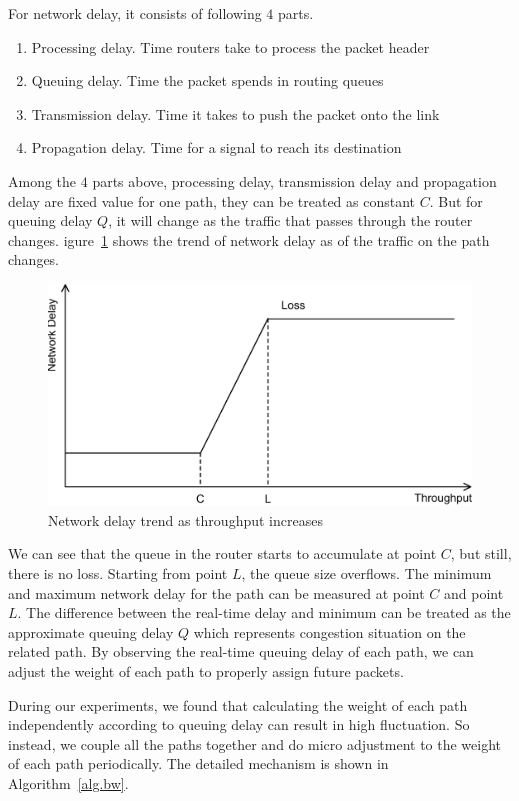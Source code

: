 For network delay, it consists of following $4$ parts.

\begin{enumerate}
\item Processing delay. Time routers take to process the packet header
\item Queuing delay. Time the packet spends in routing queues
\item Transmission delay. Time it takes to push the packet onto the link
\item Propagation delay. Time for a signal to reach its destination
\end{enumerate}

Among the $4$ parts above, processing delay, transmission delay and propagation delay are fixed value for one path, they can be treated as constant $C$. But for queuing delay $Q$, it will change as the traffic that passes through the router changes. igure~\ref{fig.delay} shows the trend of network delay as of the traffic on the path changes.

\begin{figure}
\centering
\includegraphics[width=0.8\linewidth]{fig/delay.eps}
\caption{Network delay trend as throughput increases}
\label{fig.delay}
\end{figure}

We can see that the queue in the router starts to accumulate at point $C$, but still, there is no loss. Starting from point $L$, the queue size overflows. The minimum and maximum network delay for the path can be measured at point $C$ and point $L$. The difference between the real-time delay and minimum can be treated as the approximate queuing delay $Q$ which represents congestion situation on the related path. By observing the real-time queuing delay of each path, we can adjust the weight of each path to properly assign future packets.

During our experiments, we found that calculating the weight of each path independently according to queuing delay can result in high fluctuation. So instead, we couple all the paths together and do micro adjustment to the weight of each path periodically. The detailed mechanism is shown in Algorithm~\ref{alg.bw}.

